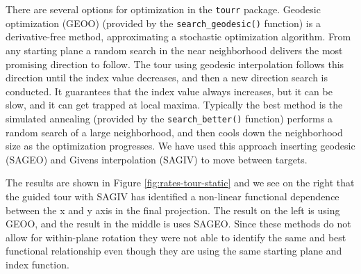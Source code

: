 There are several options for optimization in the \texttt{tourr} package. Geodesic optimization (GEOO) (provided by the \texttt{search\_geodesic()} function) is a derivative-free method, approximating a stochastic optimization algorithm. From any starting plane a random search in the near neighborhood delivers the most promising direction to follow. The tour using geodesic interpolation follows this direction until the index value decreases, and then a new direction search is conducted. It guarantees that the index value always increases, but it can be slow, and it can get trapped at local maxima. Typically the best method is the simulated annealing (provided by the \texttt{search\_better()} function) performs a random search of a large neighborhood, and then cools down the neighborhood size as the optimization progresses. We have used this approach inserting geodesic (SAGEO) and Givens interpolation (SAGIV) to move between targets.

The results are shown in Figure \ref{fig:rates-tour-static} and we see on the right that the guided tour with SAGIV has identified a non-linear functional dependence between the x and y axis in the final projection. The result on the left is using GEOO, and the result in the middle is uses SAGEO. Since these methods do not allow for within-plane rotation they were not able to identify the same and best functional relationship even though they are using the same starting plane and index function.

